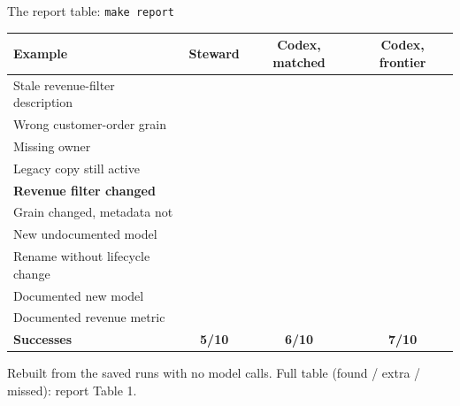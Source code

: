 \documentclass[aspectratio=169,11pt]{beamer}
\newcommand{\yes}{\textcolor{good}{\ding{51}}}
\newcommand{\no}{\textcolor{bad}{\ding{55}}}
\begin{document}
\begin{frame}{The report table: \texttt{make report}}
  \centering\small
  \begin{tabular}{@{}lccc@{}}
    \toprule
    Example & Steward & Codex, matched & Codex, frontier \\
    \midrule
    Stale revenue-filter description & \yes & \yes & \yes \\
    Wrong customer-order grain       & \no  & \no  & \yes \\
    Missing owner                    & \yes & \yes & \yes \\
    Legacy copy still active         & \no  & \no  & \no  \\
    \textbf{Revenue filter changed}  & \yes & \yes & \yes \\
    Grain changed, metadata not      & \no  & \no  & \no  \\
    New undocumented model           & \yes & \yes & \yes \\
    Rename without lifecycle change  & \yes & \yes & \yes \\
    Documented new model             & \no  & \no  & \no  \\
    Documented revenue metric        & \no  & \yes & \yes \\
    \midrule
    \textbf{Successes} & \textbf{5/10} & \textbf{6/10} & \textbf{7/10} \\
    \bottomrule
  \end{tabular}
  \par\vspace{0.4em}
  {\footnotesize\color{muted} Rebuilt from the saved runs with no model calls. Full table (found / extra / missed): report Table 1.}
\end{frame}
\end{document}
